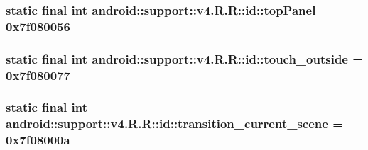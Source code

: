 \hypertarget{classandroid_1_1support_1_1v4_1_1_r_1_1id_a93e4c92ff456d0d573020bc08916e7c}{
\subsubsection[{topPanel}]{\setlength{\rightskip}{0pt plus 5cm}static final int android::support::v4.R.R::id::topPanel = 0x7f080056}}
\label{classandroid_1_1support_1_1v4_1_1_r_1_1id_a93e4c92ff456d0d573020bc08916e7c}


\hypertarget{classandroid_1_1support_1_1v4_1_1_r_1_1id_dd6676c8f3f8b4f850062100e0ba06e8}{
\subsubsection[{touch\_\-outside}]{\setlength{\rightskip}{0pt plus 5cm}static final int android::support::v4.R.R::id::touch\_\-outside = 0x7f080077}}
\label{classandroid_1_1support_1_1v4_1_1_r_1_1id_dd6676c8f3f8b4f850062100e0ba06e8}


\hypertarget{classandroid_1_1support_1_1v4_1_1_r_1_1id_1269bc9f136ad91fc347480575b5e675}{
\subsubsection[{transition\_\-current\_\-scene}]{\setlength{\rightskip}{0pt plus 5cm}static final int android::support::v4.R.R::id::transition\_\-current\_\-scene = 0x7f08000a}}
\label{classandroid_1_1support_1_1v4_1_1_r_1_1id_1269bc9f136ad91fc347480575b5e675}


